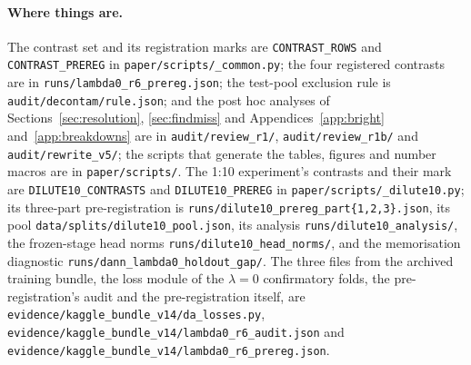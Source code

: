\paragraph{Where things are.} The contrast set and its registration marks are
\texttt{CONTRAST\_ROWS} and \texttt{CONTRAST\_PREREG} in \texttt{paper/scripts/\_common.py};
the four registered contrasts are in \texttt{runs/lambda0\_r6\_prereg.json}; the test-pool
exclusion rule is \texttt{audit/decontam/rule.json}; and the post hoc analyses of
Sections~\ref{sec:resolution}, \ref{sec:findmiss} and Appendices~\ref{app:bright}
and~\ref{app:breakdowns} are in \texttt{audit/review\_r1/}, \texttt{audit/review\_r1b/} and
\texttt{audit/rewrite\_v5/}; the
scripts that generate the tables, figures and number macros are in \texttt{paper/scripts/}.
The 1:10 experiment's contrasts and their mark are \texttt{DILUTE10\_CONTRASTS} and
\texttt{DILUTE10\_PREREG} in \texttt{paper/scripts/\_dilute10.py}; its three-part
pre-registration is
\texttt{runs/\allowbreak dilute10\_prereg\_\allowbreak part\{1,2,3\}.json}, its pool
\texttt{data/\allowbreak splits/\allowbreak dilute10\_pool.json}, its analysis
\texttt{runs/\allowbreak dilute10\_analysis/}, the frozen-stage head norms
\texttt{runs/\allowbreak dilute10\_head\_norms/}, and the memorisation diagnostic
\texttt{runs/\allowbreak dann\_lambda0\_holdout\_gap/}. The three files from the archived
training bundle, the loss module of the $\lambda = 0$ confirmatory folds, the
pre-registration's audit and the pre-registration itself, are
\texttt{evidence/\allowbreak kaggle\_bundle\_v14/\allowbreak da\_losses.py},
\texttt{evidence/\allowbreak kaggle\_bundle\_v14/\allowbreak lambda0\_r6\_audit.json} and
\texttt{evidence/\allowbreak kaggle\_bundle\_v14/\allowbreak lambda0\_r6\_prereg.json}.
